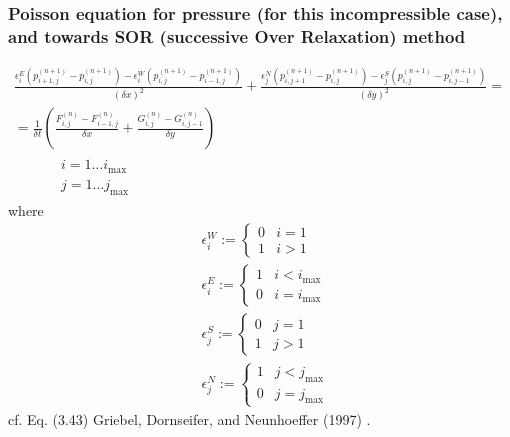 \documentclass[10pt]{amsart}
\begin{document}
\begin{multicols*}{2}
\subsubsection{Poisson equation for pressure (for this incompressible case), and towards SOR (successive Over Relaxation) method}

\begin{equation}
  \begin{gathered}
    \frac{  \epsilon_i^E (p_{i+1,j}^{(n+1)} - p_{i,j}^{(n+1)} ) - \epsilon_i^W (p_{i,j}^{(n+1)} - p_{i-1,j}^{(n+1)} ) }{ (\delta x)^2 } + \frac{ \epsilon_j^N (p_{i,j+1}^{(n+1)} - p_{i,j}^{(n+1)} ) - \epsilon_j^S(p_{i,j}^{(n+1)} - p_{i,j-1}^{(n+1)} ) }{ (\delta y)^2 } = \\
     = \frac{1}{ \delta t} \left( \frac{F_{i,j}^{(n)} - F_{i-1,j}^{(n)} }{\delta x} + \frac{ G_{i,j}^{(n)} - G_{i,j-1}^{(n)} }{ \delta y } \right) \\
    \qquad \, \begin{aligned} & i = 1\dots i_{\text{max}} \\
    & j = 1\dots j_{\text{max}} \end{aligned}
\end{gathered}
  \end{equation}
where
\[
\begin{aligned}
  & \epsilon_i^W := \begin{cases} 0 & i  =1 \\ 1 & i > 1 \end{cases} \\ 
  & \epsilon_i^E := \begin{cases} 1 & i  < i_{\text{max}} \\ 0 & i =i_{\text{max}} \end{cases} \\ 
  & \epsilon_j^S := \begin{cases} 0 & j  =1 \\ 1 & j > 1 \end{cases} \\ 
  & \epsilon_j^N := \begin{cases} 1 & j  < j_{\text{max}} \\ 0 & j = j_{\text{max}} \end{cases} 
\end{aligned}
\]
cf. Eq. (3.43)  Griebel, Dornseifer, and Neunhoeffer (1997) \cite{GDN1997}.  


\end{multicols*}
\end{document}
